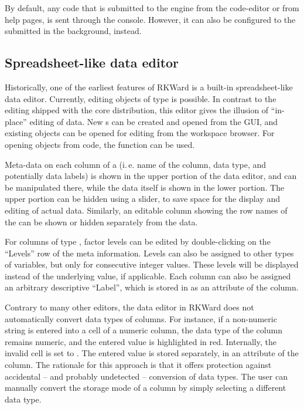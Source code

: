 By default, any code that is submitted to the
 engine from the code-editor or from help
pages, is sent through the  console.
However, it can also be configured to the submitted in the background,
instead.

\subsection{Spreadsheet-like data editor}
\label{sec:spreadsheet}

Historically, one of the earliest
features of RKWard is a built-in spreadsheet-like data editor.
Currently, editing  objects of type
 is possible. In contrast to the  editing shipped
with the  core distribution, this editor
gives the illusion of ``in-place'' editing of data. New s can
be created and opened from the GUI, and existing objects can be opened
for editing from the workspace browser. For opening objects from
 code, the function  can be used.

Meta-data on each column of a  (i.\,e. name of the column, data
type, and potentially data labels) is shown in the upper portion of
the data editor, and can be manipulated there, while the data itself is
shown in the lower portion. The upper portion can be hidden using a
slider, to save space for the display and editing of actual data.
Similarly, an editable column showing the row names of the 
can be shown or hidden separately from the data.

For columns of type , factor levels can be edited by double-clicking on the
``Levels'' row of the meta information. Levels can also be assigned to other types of
variables, but only for consecutive integer values. These levels will
be displayed instead of the underlying value, if applicable. Each
column can also be assigned an arbitrary descriptive
``Label'', which is stored in
 as an attribute of the column.

Contrary to many other editors, the data editor in RKWard does not
automatically convert data types of columns. For instance, if a
non-numeric string is entered into a cell of a numeric column, the data
type of the column remains numeric, and the entered value is
highlighted in red. Internally, the invalid cell is set to .
The entered value is stored separately, in an attribute of the column.
The rationale for this approach is that it offers protection against
accidental -- and probably undetected -- conversion of data types. The
user can manually convert the storage mode of a column by simply
selecting a different data type.


